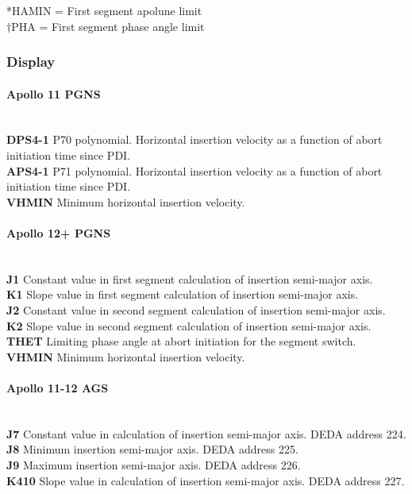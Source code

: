 \documentclass[11pt]{article} %
\begin{document}
\hfill

*HAMIN = First segment apolune limit\\
$\dagger$PHA = First segment phase angle limit\\
\newpage
\subsubsection{Display}
\paragraph{Apollo 11 PGNS}\mbox{} \\
\textbf{DPS4-1} P70 polynomial. Horizontal insertion velocity as a function of abort initiation time since PDI.\\
\textbf{APS4-1} P71 polynomial. Horizontal insertion velocity as a function of abort initiation time since PDI.\\
\textbf{VHMIN} Minimum horizontal insertion velocity.
\paragraph{Apollo 12+ PGNS}\mbox{} \\
\textbf{J1} Constant value in first segment calculation of insertion semi-major axis.\\
\textbf{K1} Slope value in first segment calculation of insertion semi-major axis.\\
\textbf{J2} Constant value in second segment calculation of insertion semi-major axis.\\
\textbf{K2} Slope value in second segment calculation of insertion semi-major axis.\\
\textbf{THET} Limiting phase angle at abort initiation for the segment switch.\\
\textbf{VHMIN} Minimum horizontal insertion velocity.
\paragraph{Apollo 11-12 AGS}\mbox{} \\
\textbf{J7} Constant value in calculation of insertion semi-major axis. DEDA address 224.\\
\textbf{J8} Minimum insertion semi-major axis. DEDA address 225.\\
\textbf{J9} Maximum insertion semi-major axis. DEDA address 226.\\
\textbf{K410} Slope value in calculation of insertion semi-major axis. DEDA address 227.
\end{document}
